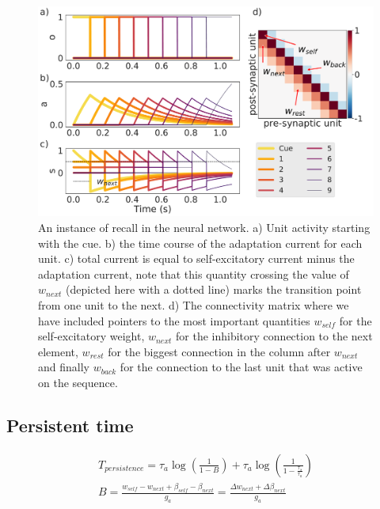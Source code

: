 \documentclass[10pt,a4paper]{article}
\begin{document}
\begin{figure}[H]
\centering
\includegraphics[scale=0.25]{simple_bcpnn_recall.pdf}
\caption{An instance of recall in the neural network. a) Unit activity starting with the cue. b) the time course of the adaptation current for each unit. c) total current is equal to self-excitatory current minus the adaptation current, note that this quantity crossing the value of $w_{next}$ (depicted here with a dotted line) marks the transition point from one unit to the next. d) The connectivity matrix where we have included pointers to the most important quantities $w_{self}$ for the self-excitatory weight, $w_{next}$ for the inhibitory connection to the next element, $w_{rest}$ for the biggest connection in the column after $w_{next}$ and finally $w_{back}$ for the connection to the last unit that was active on the sequence.}
\label{fig:recall}
\end{figure}



\subsection{Persistent time}

\begin{align}
T_{persistence} = \tau_a \log \left(\frac{1}{1 - B} \right) + \tau_a \log \left( \frac{                                                                                                                                                                                     1}{1 - \frac{\tau_s}{\tau_a}} \right)  \\ \label{eq:persistent_times}
B = \frac{w_{self} - w_{next} + \beta_{self} - \beta_{next}}{g_a} = \frac{\Delta w_{next} + \Delta \beta_{next}}{g_a}
\end{align}
\end{document}
